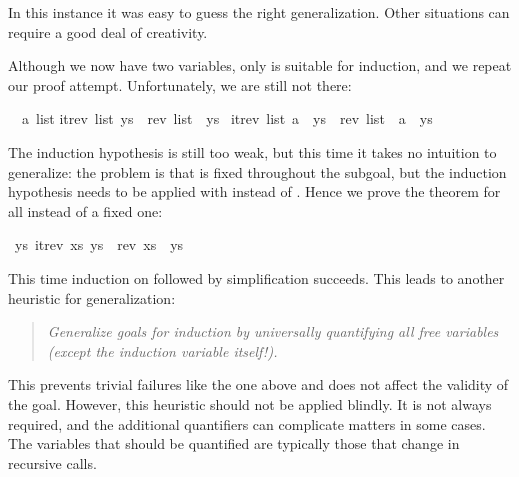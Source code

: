 \begin{isabellebody}
\begin{isamarkuptxt}
In this instance it was easy to guess the right generalization.
Other situations can require a good deal of creativity.  

Although we now have two variables, only  is suitable for
induction, and we repeat our proof attempt. Unfortunately, we are still
not there:
\begin{isabelle}%
\ {}{}\ {}a\ list{}\isanewline
{}itrev\ list\ ys\ {}\ rev\ list\ {}\ ys\ {}\isanewline
{}itrev\ list\ {}a\ {}\ ys{}\ {}\ rev\ list\ {}\ a\ {}\ ys%
\end{isabelle}
The induction hypothesis is still too weak, but this time it takes no
intuition to generalize: the problem is that  is fixed throughout
the subgoal, but the induction hypothesis needs to be applied with
 instead of . Hence we prove the theorem
for all  instead of a fixed one:%
\end{isamarkuptxt}%
\isamarkuptrue%
%
\endisatagproof
{\isafoldproof}%
%
\isadelimproof
%
\endisadelimproof
{}\isamarkupfalse%
\ {}{}ys{}\ itrev\ xs\ ys\ {}\ rev\ xs\ {}\ ys{}%
\isadelimproof
%
\endisadelimproof
%
\isatagproof
%
\endisatagproof
{\isafoldproof}%
%
\isadelimproof
%
\endisadelimproof
%
\begin{isamarkuptext}%
\noindent
This time induction on  followed by simplification succeeds. This
leads to another heuristic for generalization:
\begin{quote}
\emph{Generalize goals for induction by universally quantifying all free
variables {\em(except the induction variable itself!)}.}
\end{quote}
This prevents trivial failures like the one above and does not affect the
validity of the goal.  However, this heuristic should not be applied blindly.
It is not always required, and the additional quantifiers can complicate
matters in some cases. The variables that should be quantified are typically
those that change in recursive calls.


\end{isamarkuptext}
\end{isabellebody}
